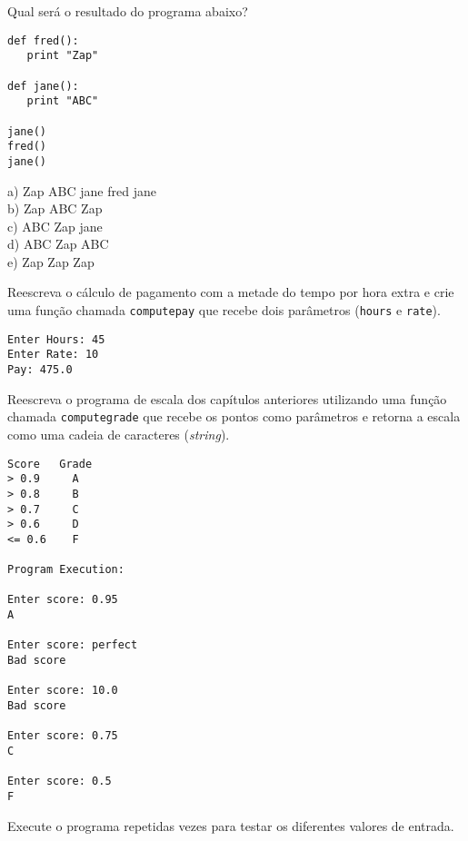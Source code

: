 \begin{ex}
Qual será o resultado do programa abaixo?
\beforeverb
\begin{verbatim}
def fred():
   print "Zap"

def jane():
   print "ABC"

jane()
fred()
jane()
\end{verbatim}
\afterverb
%
a) Zap ABC jane fred jane\\
b) Zap ABC Zap\\
c) ABC Zap jane\\
d) ABC Zap ABC\\
e) Zap Zap Zap
\end{ex}

\begin{ex}

Reescreva o cálculo de pagamento com a metade do tempo por hora extra e crie
uma função chamada {\tt computepay} que recebe dois parâmetros ({\tt hours} e 
{\tt rate}).
\begin{verbatim}
Enter Hours: 45
Enter Rate: 10
Pay: 475.0
\end{verbatim}
\end{ex}

\begin{ex}

Reescreva o programa de escala dos capítulos anteriores utilizando uma função
chamada {\tt computegrade} que recebe os pontos como parâmetros e retorna a
escala como uma cadeia de caracteres ({\it string}).
\begin{verbatim}
Score   Grade
> 0.9     A
> 0.8     B
> 0.7     C
> 0.6     D
<= 0.6    F

Program Execution:

Enter score: 0.95
A

Enter score: perfect
Bad score

Enter score: 10.0
Bad score

Enter score: 0.75
C

Enter score: 0.5
F
\end{verbatim}

Execute o programa repetidas vezes para testar os diferentes valores de entrada.
\end{ex}


